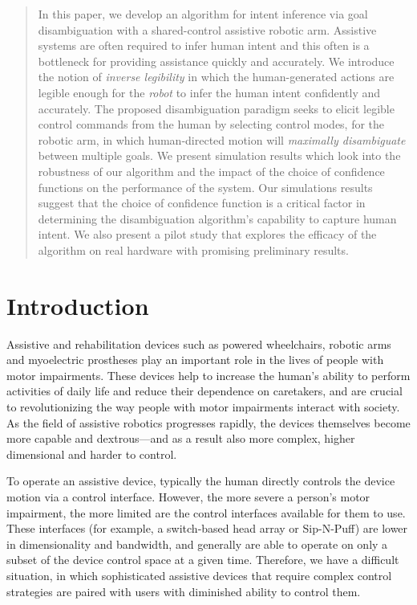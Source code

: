 \documentclass[conference]{IEEEtran}
\begin{document}
\begin{abstract}

In this paper, we develop an algorithm for intent inference via goal disambiguation with a shared-control assistive robotic arm. Assistive systems are often required to infer human intent and this often is a bottleneck for providing assistance quickly and accurately. We introduce the notion of \textit{inverse legibility} in which the human-generated actions are legible enough for the \textit{robot} to infer the human intent confidently and accurately. The proposed disambiguation paradigm seeks to elicit legible control commands from the human by selecting control modes, for the robotic arm, in which human-directed motion will \textit{maximally disambiguate} between multiple goals. We present simulation results which look into the robustness of our algorithm and the impact of the choice of confidence functions on the performance of the system.  
Our simulations results suggest that the choice of confidence function is a critical factor in determining the disambiguation algorithm's capability to capture human intent. We also present a pilot study that explores the efficacy of the algorithm on real hardware with promising preliminary results.
 
\end{abstract}

\IEEEpeerreviewmaketitle

\section{Introduction}

Assistive and rehabilitation devices such as powered wheelchairs, robotic arms and myoelectric prostheses play an important role in the lives of people with motor impairments. These devices help to increase the human's ability to perform activities of daily life and reduce their dependence on caretakers, and are crucial to revolutionizing the way people with motor impairments interact with society. As the field of assistive robotics progresses rapidly, the devices themselves become more capable and dextrous---and as a result also more complex, higher dimensional and harder to control. 

To operate an assistive device, typically the human directly controls the device motion via a control interface. However, the more severe a person's motor impairment, the more limited are the control interfaces available for them to use. These interfaces (for example, a switch-based head array or Sip-N-Puff) are lower in dimensionality and bandwidth, and generally are able to operate on only a subset of the device control space at a given time. Therefore, we have a difficult situation, in which sophisticated assistive devices that require complex control strategies are paired with users with diminished ability to control them.
\end{document}

